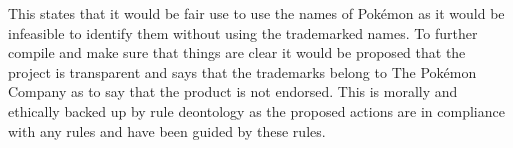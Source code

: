 \documentclass[a4paper]{article}
\newcommand{\Pokemon}{Pok\'{e}mon}
\begin{document}
This states that it would be fair use to use the names of \Pokemon{} as it would be infeasible to identify them without using the trademarked names.
To further compile and make sure that things are clear it would be proposed that the project is transparent and says that the trademarks belong to The \Pokemon{} Company as to say that the product is not endorsed.
This is morally and ethically backed up by rule deontology as the proposed actions are in compliance with any rules and have been guided by these rules.



\end{document}
